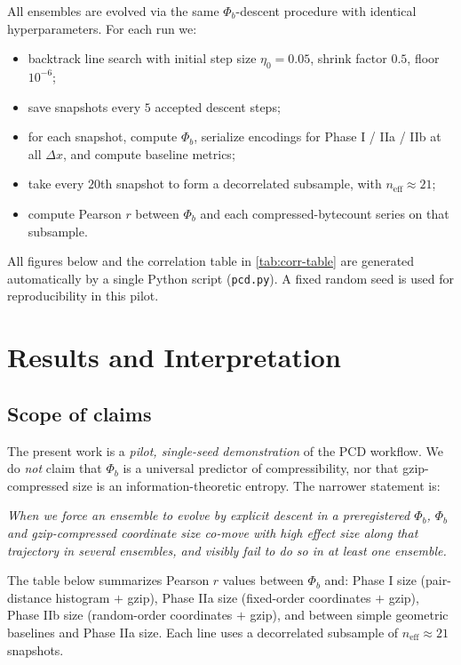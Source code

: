 \documentclass[11pt,a4paper]{article}
\newcommand{\phib}{\Phi_b}
\begin{document}
All ensembles are evolved via the same $\phib$-descent procedure with identical hyperparameters. For each run we:
\begin{itemize}
\item backtrack line search with initial step size $\eta_0 = 0.05$, shrink factor $0.5$, floor $10^{-6}$;
\item save snapshots every $5$ accepted descent steps;
\item for each snapshot, compute $\phib$, serialize encodings for Phase I / IIa / IIb at all $\Delta x$, and compute baseline metrics;
\item take every $20$th snapshot to form a decorrelated subsample, with $n_{\text{eff}}\approx 21$;
\item compute Pearson $r$ between $\phib$ and each compressed-bytecount series on that subsample.
\end{itemize}

All figures below and the correlation table in \cref{tab:corr-table} are generated automatically by a single Python script (\texttt{pcd.py}). A fixed random seed is used for reproducibility in this pilot.

\section{Results and Interpretation}
\subsection*{Scope of claims}
The present work is a \emph{pilot, single-seed demonstration} of the PCD workflow. We do \emph{not} claim that $\phib$ is a universal predictor of compressibility, nor that gzip-compressed size is an information-theoretic entropy. The narrower statement is:

\medskip
\noindent
\emph{When we force an ensemble to evolve by explicit descent in a preregistered $\phib$, $\phib$ and gzip-compressed coordinate size co-move with high effect size along that trajectory in several ensembles, and visibly fail to do so in at least one ensemble.}

\medskip

The table below summarizes Pearson $r$ values between $\phib$ and:
Phase I size (pair-distance histogram $+$ gzip),
Phase IIa size (fixed-order coordinates $+$ gzip),
Phase IIb size (random-order coordinates $+$ gzip),
and between simple geometric baselines and Phase IIa size.
Each line uses a decorrelated subsample of $n_{\text{eff}}\approx 21$ snapshots.
\end{document}
